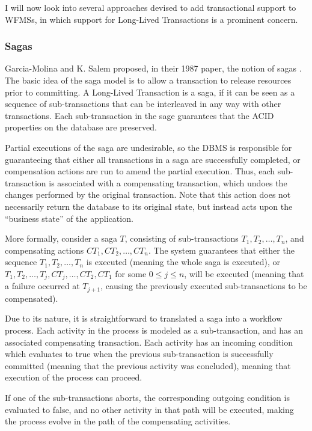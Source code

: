 \documentclass{llncs}
\begin{document}
I will now look into several approaches devised to add transactional
support to WFMSs, in which support for Long-Lived Transactions is a
prominent concern.

\subsubsection{Sagas}

Garcia-Molina and K. Salem proposed, in their 1987 paper, the notion
of sagas \cite{garcia1987sagas}. The basic idea of the saga model is
to allow a transaction to release resources prior to committing. A
Long-Lived Transaction is a saga, if it can be seen as a sequence of
sub-transactions that can be interleaved in any way with other
transactions. Each sub-transaction in the sage guarantees that the
ACID properties on the database are preserved.

Partial executions of the saga are undesirable, so the DBMS is
responsible for guaranteeing that either all transactions in a saga
are successfully completed, or compensation actions are run to amend
the partial execution. Thus, each sub-transaction is associated with a
compensating transaction, which undoes the changes performed by the
original transaction. Note that this action does not necessarily
return the database to its original state, but instead acts upon the
``business state'' of the application.

More formally, consider a saga $T$, consisting of sub-transactions
$T_1, T_2, \ldots, T_n$, and compensating actions $CT_1, CT_2, \ldots,
CT_n$. The system guarantees that either the sequence $T_1, T_2,
\ldots, T_n$ is executed (meaning the whole saga is executed), or
$T_1, T_2, \ldots, T_j,CT_j, \ldots, CT_2, CT_1$ for some $0 \le j \le
n$, will be executed (meaning that a failure occurred at $T_{j+1}$,
causing the previously executed sub-transactions to be compensated).

Due to its nature, it is straightforward to translated a saga into a
workflow process. Each activity in the process is modeled as a
sub-transaction, and has an associated compensating transaction. Each
activity has an incoming condition which evaluates to true when the
previous sub-transaction is successfully committed (meaning that the
previous activity was concluded), meaning that execution of the
process can proceed.

If one of the sub-transactions aborts, the corresponding outgoing
condition is evaluated to false, and no other activity in that path
will be executed, making the process evolve in the path of the
compensating activities.
\end{document}
